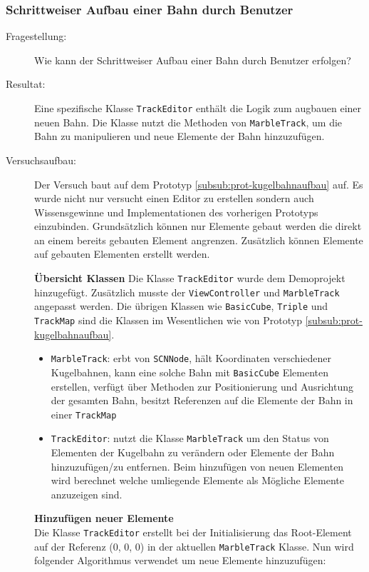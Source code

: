 \subsubsection{Schrittweiser Aufbau einer Bahn durch Benutzer}\label{subsub:prot-kugelbahneditor}
\begin{description}
	\item[Fragestellung:] Wie kann der Schrittweiser Aufbau einer Bahn durch Benutzer erfolgen?
	\item[Resultat:] Eine spezifische Klasse \texttt{TrackEditor} enthält die Logik zum augbauen einer neuen Bahn. Die Klasse nutzt die Methoden von \texttt{MarbleTrack}, um die Bahn zu manipulieren und neue Elemente der Bahn hinzuzufügen.
	\item[Versuchsaufbau:] Der Versuch baut auf dem Prototyp \ref{subsub:prot-kugelbahnaufbau} auf. Es wurde nicht nur versucht einen Editor zu erstellen sondern auch Wissensgewinne und Implementationen des vorherigen Prototyps einzubinden. Grundsätzlich können nur Elemente gebaut werden die direkt an einem bereits gebauten Element angrenzen. Zusätzlich können Elemente auf gebauten Elementen erstellt werden. 

	\textbf{Übersicht Klassen}
	Die Klasse \texttt{TrackEditor} wurde dem Demoprojekt hinzugefügt. Zusätzlich musste der \texttt{ViewController} und \texttt{MarbleTrack} angepasst werden. Die übrigen Klassen wie \texttt{BasicCube}, \texttt{Triple} und \texttt{TrackMap} sind die Klassen im Wesentlichen wie von Prototyp \ref{subsub:prot-kugelbahnaufbau}.
	\begin{itemize}
		\item \texttt{MarbleTrack}: erbt von \texttt{SCNNode}, hält Koordinaten verschiedener Kugelbahnen, kann eine solche Bahn mit \texttt{BasicCube} Elementen erstellen, verfügt über Methoden zur Positionierung und Ausrichtung der gesamten Bahn, besitzt Referenzen auf die Elemente der Bahn in einer \texttt{TrackMap}
		\item \texttt{TrackEditor}: nutzt die Klasse \texttt{MarbleTrack} um den Status von Elementen der Kugelbahn zu verändern oder Elemente der Bahn hinzuzufügen/zu entfernen. Beim hinzufügen von neuen Elementen wird berechnet welche umliegende Elemente als Mögliche Elemente anzuzeigen sind.
	\end{itemize}

	\textbf{Hinzufügen neuer Elemente}\\
	Die Klasse \texttt{TrackEditor} erstellt bei der Initialisierung das Root-Element auf der Referenz (0, 0, 0) in der aktuellen \texttt{MarbleTrack} Klasse. Nun wird folgender Algorithmus verwendet um neue Elemente hinzuzufügen:
	

\end{description}
